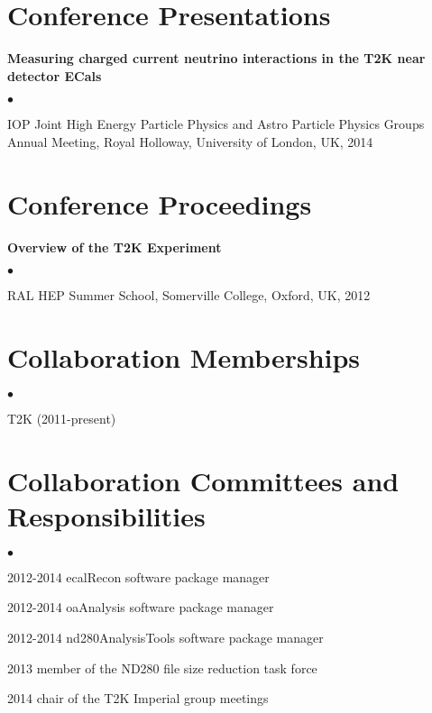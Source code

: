 \documentclass[margin,line]{res}
\newenvironment{list2}{
  \begin{list}{$\bullet$}{%
      \setlength{\itemsep}{0in}
      \setlength{\parsep}{0in} \setlength{\parskip}{0in}
      \setlength{\topsep}{0in} \setlength{\partopsep}{0in} 
      \setlength{\leftmargin}{0.2in}}}{\end{list}}
\begin{document}
\begin{resume}
\section{\sc Conference Presentations}

{\bf Measuring charged current neutrino interactions in the T2K near detector ECals}
\begin{list2}
\item IOP Joint High Energy Particle Physics and Astro Particle Physics Groups Annual Meeting, Royal Holloway, University of London, UK, 2014
\end{list2}

\section{\sc Conference Proceedings}
%
%
%
\begin{refsection}[proceedings]
\nocite{*}
\printbibliography
\end{refsection}


{\bf Overview of the T2K Experiment}
\begin{list2}
\item RAL HEP Summer School, Somerville College, Oxford, UK, 2012
\end{list2}

\section{\sc Collaboration Memberships} 
\begin{list2}
\item T2K (2011-present)


\end{list2}

\section{\sc Collaboration Committees and Responsibilities} 
\begin{list2}
\item 2012-2014 ecalRecon software package manager
\item 2012-2014 oaAnalysis software package manager
\item 2012-2014 nd280AnalysisTools software package manager
\item 2013 member of the ND280 file size reduction task force
\item 2014 chair of the T2K Imperial group meetings



\end{list2}
\end{resume}
\end{document}

